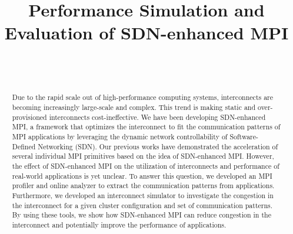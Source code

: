 \documentclass[10pt, a4paper]{IEEEtran}
\begin{document}
\title{Performance Simulation and Evaluation of SDN-enhanced MPI}

\author{%
     \\
     \\
}

\maketitle

\begin{abstract}
    Due to the rapid scale out of high-performance computing systems,
    interconnects are becoming increasingly large-scale and complex. This
    trend is making static and over-provisioned interconnects
    cost-ineffective. We have been developing SDN-enhanced MPI, a framework
    that optimizes the interconnect to fit the communication patterns of MPI
    applications by leveraging the dynamic network controllability of
    Software-Defined Networking (SDN). Our previous works have demonstrated
    the acceleration of several individual MPI primitives based on the idea of
    SDN-enhanced MPI\@. However, the effect of SDN-enhanced MPI on the
    utilization of interconnects and performance of real-world applications is
    yet unclear. To answer this question, we developed an MPI profiler and
    online analyzer to extract the communication patterns from applications.
    Furthermore, we developed an interconnect simulator to investigate the
    congestion in the interconnect for a given cluster configuration and set
    of communication patterns. By using these tools, we show how SDN-enhanced
    MPI can reduce congestion in the interconnect and potentially improve the
    performance of applications.
\end{abstract}
\end{document}
